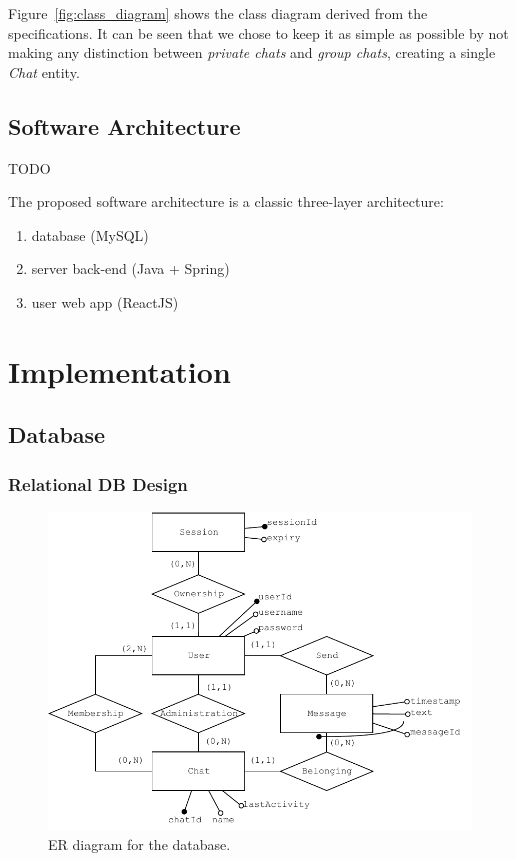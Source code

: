 \documentclass[10pt]{article}
\begin{document}
Figure~\ref{fig:class_diagram} shows the class diagram derived from the specifications. 
It can be seen that we chose to keep it as simple as possible by not making  
any distinction between \emph{private chats} and \emph{group chats}, 
creating a single \emph{Chat} entity.

\subsection{Software Architecture}
TODO

The proposed software architecture is a classic three-layer architecture:
\begin{enumerate}
    \item database (MySQL)
    \item server back-end (Java + Spring)
    \item user web app (ReactJS)
\end{enumerate}

\clearpage
\section{Implementation}

\subsection{Database}
\subsubsection{Relational DB Design}
\begin{figure}[]
    \centering
    \includegraphics[width=\textwidth]{figs/ER}
    \caption{ER diagram for the database.}
    \label{fig:er}
\end{figure}
\end{document}
